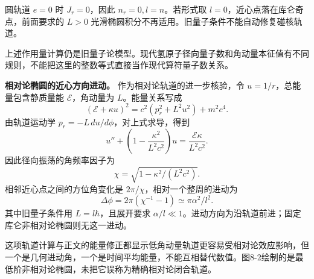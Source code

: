 \documentclass[12pt,a4paper,UTF8]{ctexart}
\begin{document}
圆轨道 \(e=0\) 时 \(J_r=0\)，因此 \(n_r=0,l=n\)。若形式取
\(l=0\)，近心点落在库仑奇点，前面要求的 \(L>0\)
光滑椭圆积分不再适用。旧量子条件不能自动修复碰核轨道。

上述作用量计算仍是旧量子论模型。现代氢原子径向量子数和角动量本征值有不同规则，不能把这里的整数等式直接当作现代算符量子数关系。

\textbf{相对论椭圆的近心方向进动。} 作为相对论轨道的进一步核验，令
\(u=1/r\)，总能量包含静质量能 \(\mathcal E\)，角动量为
\(L\)。能量关系写成 \[
(\mathcal E+\kappa u)^2=c^2(p_r^2+L^2u^2)+m^2c^4.
\] 由轨道运动学 \(p_r=-L\,du/d\phi\)，对上式求导，得到 \[
u''+\left(1-\frac{\kappa^2}{L^2c^2}\right)u
=\frac{\mathcal E\kappa}{L^2c^2}.
\] 因此径向振荡的角频率因子为 \[
\chi=\sqrt{1-\kappa^2/(L^2c^2)}.
\] 相邻近心点之间的方位角变化是 \(2\pi/\chi\)，相对一个整周的进动为 \[
\Delta\phi=2\pi(\chi^{-1}-1)
\simeq\pi\alpha^2/l^2.
\] 其中旧量子条件用 \(L=l\hbar\)，且展开要求
\(\alpha/l\ll1\)。进动方向为沿轨道前进；固定库仑非相对论椭圆则无这一进动。

这项轨道计算与正文的能量修正都显示低角动量轨道更容易受相对论效应影响，但一个是几何进动角，一个是时间平均能量，不能互相替代数值。图8-2绘制的是最低阶非相对论椭圆，未把它误称为精确相对论闭合轨道。
\end{document}
